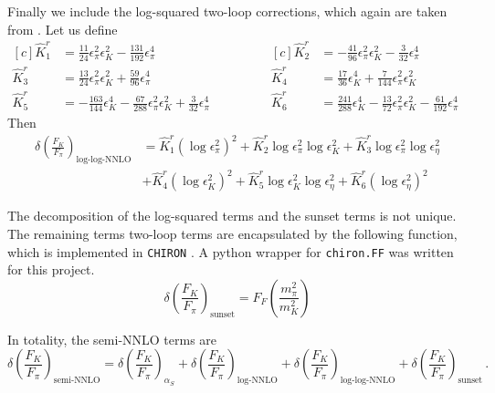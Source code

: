 \documentclass[prd,tightenlines,preprintnumbers,showpacs,superscriptaddress,notitlepage,eqsecnum,floatfix,notitlepage]{revtex4-1}
\begin{document}
Finally we include the log-squared two-loop corrections, which again are taken from \cite{Ananthanarayan:2017qmx}.  Let us define 
\begin{equation}
\begin{aligned}[c]
\hat K^r_1  &=  \frac{11}{24} \epsilon_\pi^2 \epsilon_K^2 - \frac{131}{192} \epsilon_\pi^4 \\
\hat K^r_3 & = \frac{13}{24} \epsilon_\pi^2 \epsilon_K^2 + \frac{59}{96} \epsilon_\pi^4 \qquad \\
\hat K^r_5  &= -\frac{163}{144}  \epsilon_K^4 - \frac{67}{288} \epsilon_\pi^2 \epsilon_K^2 + \frac{3}{32} \epsilon_\pi^4 \qquad
\end{aligned}
\qquad
\begin{aligned}[c]
\hat K^r_2 &= -\frac{41}{96} \epsilon_\pi^2 \epsilon_K^2 - \frac{3}{32} \epsilon_\pi^4  \\
\hat K^r_4 &= \frac{17}{36} \epsilon_K^4 + \frac{7}{144} \epsilon_\pi^2 \epsilon_K^2 \\
\hat K^r_6 &= \frac{241}{288}  \epsilon_K^4 - \frac{13}{72} \epsilon_\pi^2 \epsilon_K^2 - \frac{61}{192}  \epsilon_\pi^4 \qquad
\end{aligned}
\end{equation}
Then
\begin{align}
\delta\left(\frac{F_K}{F_\pi}\right)_\text{log-log-NNLO} &=
 \hat K^r_1 \left( \log \epsilon_\pi^2 \right)^2
 + \hat K^r_2 \log \epsilon_\pi^2  \log \epsilon_K^2
 + \hat K^r_3 \log \epsilon_\pi^2 \log \epsilon_\eta^2 \\
 &+\hat K^r_4 \left( \log \epsilon_K^2 \right)^2
 +\hat K^r_5 \log \epsilon_K^2  \log \epsilon_\eta^2
  +\hat K^r_6 \left( \log \epsilon_\eta^2 \right)^2 \nonumber
\end{align}

The decomposition of the log-squared terms and the sunset terms is not unique. The remaining terms two-loop terms are encapsulated by the following function, which is implemented in \texttt{CHIRON} \cite{Bijnens:2014gsa}. A python wrapper for \texttt{chiron.FF} was written for this project.
\begin{equation}
\delta\left(\frac{F_K}{F_\pi}\right)_{\text{sunset}} = F_F \left( \frac{m_\pi^2}{m_K^2}\right)
\end{equation}

In totality, the semi-NNLO terms are
\begin{equation}
\delta\left(\frac{F_K}{F_\pi}\right)_{\text{semi-NNLO}} =
\delta\left(\frac{F_K}{F_\pi}\right)_{\alpha_S}
+ \delta\left(\frac{F_K}{F_\pi}\right)_{\text{log-NNLO}}
+ \delta\left(\frac{F_K}{F_\pi}\right)_{\text{log-log-NNLO}}
+ \delta\left(\frac{F_K}{F_\pi}\right)_{\text{sunset}} \, .
\end{equation}
\end{document}
